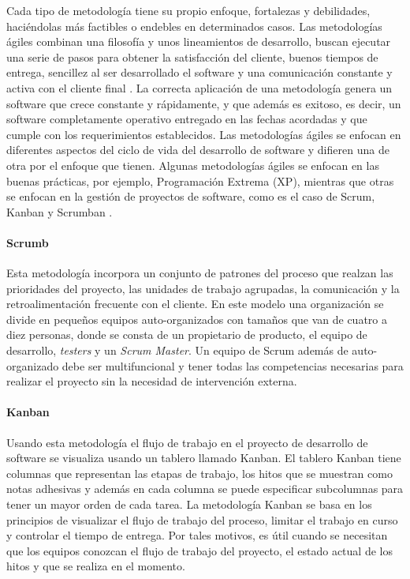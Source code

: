 Cada tipo de metodología tiene su propio enfoque, fortalezas y debilidades, haciéndolas más factibles o endebles en determinados casos. Las metodologías ágiles combinan una filosofía y unos lineamientos de desarrollo, buscan ejecutar una serie de pasos para obtener la satisfacción del cliente, buenos tiempos de entrega, sencillez al ser desarrollado el software y una comunicación constante y activa con el cliente final \parencite{Pressman2002}. La correcta aplicación de una metodología genera un software que crece constante y rápidamente, y que además es exitoso, es decir, un software completamente operativo entregado en las fechas acordadas y que cumple con los requerimientos establecidos. Las metodologías ágiles se enfocan en diferentes aspectos del ciclo de vida del desarrollo de software y difieren una de otra por el enfoque que tienen. Algunas metodologías ágiles se enfocan en las buenas prácticas, por ejemplo, Programación Extrema (XP), mientras que otras se enfocan en la gestión de proyectos de software, como es el caso de Scrum, Kanban y Scrumban \parencite{Khan2014}.

\paragraph{Scrumb} Esta metodología incorpora un conjunto de patrones del proceso que realzan las prioridades del proyecto, las unidades de trabajo agrupadas, la comunicación y la retroalimentación frecuente con el cliente. En este modelo una organización se divide en pequeños equipos auto-organizados con tamaños que van de cuatro a diez personas, donde se consta de un propietario de producto, el equipo de desarrollo, \textit{testers} y un \textit{Scrum Master}. Un equipo de Scrum además de auto-organizado debe ser multifuncional y tener todas las competencias necesarias para realizar el proyecto sin la necesidad de intervención externa.

\paragraph{Kanban} Usando esta metodología el flujo de trabajo en el proyecto de desarrollo de software se visualiza usando un tablero llamado Kanban. El tablero Kanban tiene columnas que representan las etapas de trabajo, los hitos que se muestran como notas adhesivas y además en cada columna se puede especificar subcolumnas para tener un mayor orden de cada tarea. La metodología Kanban se basa en los principios de visualizar el flujo de trabajo del proceso, limitar el trabajo en curso y controlar el tiempo de entrega. Por tales motivos, es útil cuando se necesitan que los equipos conozcan el flujo de trabajo del proyecto, el estado actual de los hitos y que se realiza en el momento.

